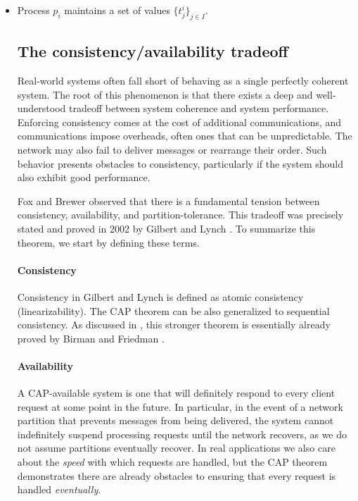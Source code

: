 \begin{itemize}
  \item Process $p_i$ maintains a set of values $\{t^i_j\}_{j \in I}$.

\subsection{The consistency/availability tradeoff}

Real-world systems often fall short of behaving as a single perfectly
coherent system. The root of this phenomenon is that there exists a
deep and well-understood tradeoff between system coherence and system
performance. Enforcing consistency comes at the cost of additional
communications, and communications impose overheads, often ones that
can be unpredictable. The network may also fail to deliver messages or
rearrange their order. Such behavior presents obstacles to
consistency, particularly if the system should also exhibit good
performance.

Fox and Brewer \cite{1999foxbrewer} observed that there is a
fundamental tension between consistency, availability, and
partition-tolerance. This tradeoff was precisely stated and proved in
2002 by Gilbert and Lynch \cite{2002gilbertlynchCAP}. To summarize
this theorem, we start by defining these terms.

\paragraph{Consistency}

Consistency in Gilbert and Lynch is defined as atomic consistency
(linearizability). The CAP theorem can be also generalized to
sequential consistency. As discussed in \cite{2019wideningcap}, this
stronger theorem is essentially already proved by Birman and Friedman
\cite{10.5555/866855}.

\paragraph{Availability}

A CAP-available system is one that will definitely respond to every
client request at some point in the future. In particular, in the
event of a network partition that prevents messages from being
delivered, the system cannot indefinitely suspend processing requests
until the network recovers, as we do not assume partitions eventually
recover. In real applications we also care about the \emph{speed} with
which requests are handled, but the CAP theorem demonstrates there are
already obstacles to ensuring that every request is handled
\emph{eventually}.


\end{itemize}
